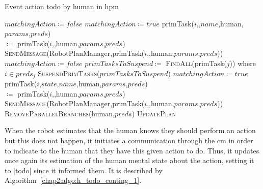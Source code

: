 \documentclass[a4paper,11pt,twoside]{StyleThese}
\begin{document}
\begin{algorithm}[!htb]
	\caption{Event action todo by human in \acrshort{hpm}}
	\label{chap2:algo:h_todo}
	\begin{algorithmic}
	\State $matchingAction \coloneqq false$
		\State $matchingAction \coloneqq true$
		\EndIf
	\EndWhile
	 \Return \EndIf
	\State primTask($i$,,$name$,human,$params$,$preds$) 
	\\\hfill $\coloneqq$ primTask($i$,,human,$params$,$preds$)
	\State \textsc{SendMessage}(RobotPlanManager,primTask($i$,,human,$params$,$preds$))
	\State $matchingAction \coloneqq false$
	\EndIf
	\State $primTasksToSuspend \coloneqq$ \textsc{FindAll}(primTask($j$)) where $i \in preds_j$ 
	\State \textsc{SuspendPrimTasks}($primTasksToSuspend$)
		\State $matchingAction \coloneqq true$
		\EndIf
	\EndWhile
	 \Return \EndIf
	\State primTask($i$,$state$,$name$,human,$params$,$preds$) 
	\\\hfill $\coloneqq$ primTask($i$,,human,$params$,$preds$)
	\State \textsc{SendMessage}(RobotPlanManager,primTask($i$,,human,$params$,$preds$))
	\State \textsc{RemoveParallelBranches}(human,$preds$) 
	\State \textsc{UpdatePlan} 
	\EndFunction	
	\end{algorithmic}
\end{algorithm}	

When the robot estimates that the human knows they should perform an action but this does not happen, it initiates a communication through the \acrlong{cm} in order to indicate to the human that they have this given action to do. Thus, it updates once again its estimation of the human mental state about the action, setting it to |todo| since it informed them. It is described by Algorithm~\ref{chap2:algo:h_todo_conting_1}.
\end{document}
